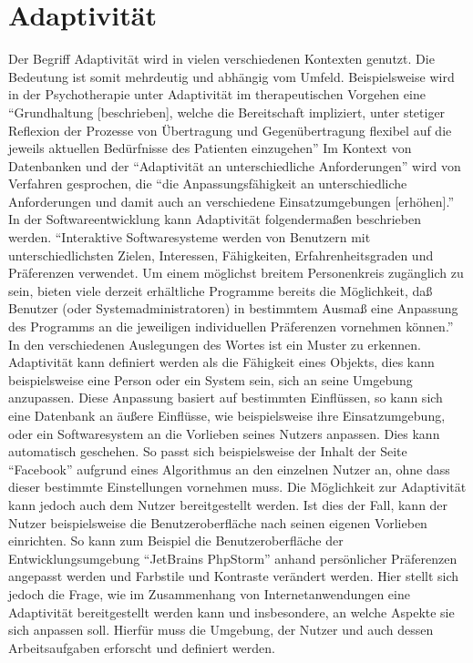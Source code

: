 \documentclass[12pt, paper=a4, bibtotoc, toc=listof, headsepline=true]{scrreprt}
\begin{document}
\chapter{Adaptivität}
Der Begriff Adaptivität wird in vielen verschiedenen Kontexten genutzt. Die Bedeutung ist somit mehrdeutig und abhängig vom Umfeld. Beispielsweise wird in der Psychotherapie unter Adaptivität im therapeutischen Vorgehen eine \enquote{Grundhaltung [beschrieben], welche die Bereitschaft impliziert, unter stetiger Reflexion der Prozesse von Übertragung und Gegenübertragung flexibel auf die jeweils aktuellen Bedürfnisse des Patienten einzugehen}\cite[S. 45]{woeller2014tiefenpsychologisch} Im Kontext von Datenbanken und der \enquote{Adaptivität an unterschiedliche Anforderungen} wird von Verfahren gesprochen, die \enquote{die Anpassungsfähigkeit an unterschiedliche Anforderungen und damit auch an verschiedene Einsatzumgebungen [erhöhen].}\cite[][S. 112]{loeser2013web}
In der Softwareentwicklung kann Adaptivität folgendermaßen beschrieben werden. \enquote{Interaktive Softwaresysteme werden von Benutzern mit unterschiedlichsten Zielen, Interessen, Fähigkeiten, Erfahrenheitsgraden und Präferenzen verwendet. Um einem möglichst breitem Personenkreis zugänglich zu sein, bieten viele derzeit erhältliche Programme bereits die Möglichkeit, daß Benutzer (oder Systemadministratoren) in bestimmtem Ausmaß eine Anpassung des Programms an die jeweiligen individuellen Präferenzen vornehmen können.}\cite[S. 1]{Kobsa1993}
\newline In den verschiedenen Auslegungen des Wortes ist ein Muster zu erkennen. Adaptivität kann definiert werden als die Fähigkeit eines Objekts, dies kann beispielsweise eine Person oder ein System sein, sich an seine Umgebung anzupassen. Diese Anpassung basiert auf bestimmten Einflüssen, so kann sich eine Datenbank an äußere Einflüsse, wie beispielsweise ihre Einsatzumgebung, oder ein Softwaresystem an die Vorlieben seines Nutzers anpassen. Dies kann automatisch geschehen. So passt sich beispielsweise der Inhalt der Seite \enquote{Facebook} aufgrund eines Algorithmus an den einzelnen Nutzer an, ohne dass dieser bestimmte Einstellungen vornehmen muss.\cite[vgl.]{Rixecker2016} Die Möglichkeit zur Adaptivität kann jedoch auch dem Nutzer bereitgestellt werden. Ist dies der Fall, kann der Nutzer beispielsweise die Benutzeroberfläche nach seinen eigenen Vorlieben einrichten. So kann zum Beispiel die Benutzeroberfläche der Entwicklungsumgebung \enquote{JetBrains PhpStorm} anhand persönlicher Präferenzen angepasst werden und Farbstile und Kontraste verändert werden.
\newline Hier stellt sich jedoch die Frage, wie im Zusammenhang von Internetanwendungen eine Adaptivität bereitgestellt werden kann und insbesondere, an welche Aspekte sie sich anpassen soll. Hierfür muss die Umgebung, der Nutzer und auch dessen Arbeitsaufgaben erforscht und definiert werden.
\end{document}
